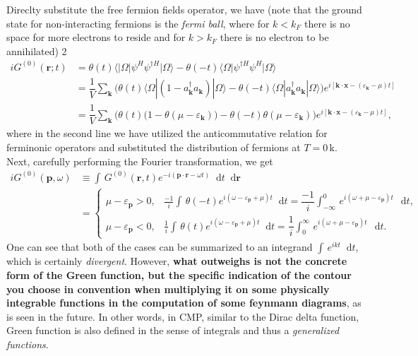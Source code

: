 \documentclass[b5paper,10pt,UTF8]{book}
\newcommand*\dd{\mathop{}\!\mathrm{d}}
\numberwithin{equation}{section}
\begin{document}
			\begin{Proof}
			Direclty substitute the free fermion fields operator, we have (note that the ground state for non-interacting fermions is the \emph{fermi ball}, where for $k<k_F$ there is no space for more electrons to reside and for $k>k_F$ there is no electron to be annihilated)
2				\begin{align*}
					iG^{(0)}(\bm{r};t)&=\theta(t)\langle|\Omega|\psi^H\psi^{\dagger H}|\Omega\rangle-\theta(-t)\langle\Omega|\psi^{\dagger H}\psi^H|\Omega\rangle\\\
					&=\dfrac{1}{V}\sum_{\bm{k}}\bigg(\theta(t)\langle\Omega|(1-a_{\bm{k}}^\dagger a_{\bm{k}})|\Omega\rangle-\theta(-t)\langle\Omega|a_{\bm{k}}^\dagger a_{\bm{k}}|\Omega\rangle\bigg)e^{i[\bm{k\cdot x}-(\varepsilon_{\bm{k}}-\mu)t]}\\
					&=\dfrac{1}{V}\sum_{\bm{k}}\bigg(\theta(t)\big(1-\theta(\mu-\varepsilon_{\bm{k}})\big)-\theta(-t)\theta(\mu-\varepsilon_{\bm{k}})\bigg)e^{i[\bm{k\cdot x}-(\varepsilon_{\bm{k}}-\mu)t]},
				\end{align*}
				where in the second line we have utilized the anticommutative relation for ferminonic operators and substituted the distribution of fermions at $T=0\,\mathrm{k}$. Next, carefully performing the Fourier transformation, we get 
				\begin{align*}
					iG^{(0)}(\bm{p},\omega)&\equiv\int\,G^{(0)}(\bm{r},t)e^{-i(\bm{p\cdot r}-\omega t)}\dd t\dd\bm{r}\\
					&=	\begin{cases}
							\displaystyle\mu-\varepsilon_{\bm{p}}>0,&\displaystyle\frac{-1}{i}\int\,\theta(-t)e^{i(\omega-\varepsilon_{\bm p}+\mu)t}\dd t=\dfrac{-1}{i}\int_{-\infty}^0\,e^{i(\omega+\mu-\varepsilon_{\bm p})t}\,\dd t,\\[0.7pc]
							\displaystyle\mu-\varepsilon_{\bm{p}}<0,&\displaystyle\frac{1}{i}\int\,\theta(t)e^{i(\omega-\varepsilon_{\bm p}+\mu)t}\dd t=\dfrac{1}{i}\int_0^\infty\,e^{i(\omega+\mu-\varepsilon_{\bm p})t}\,\dd t.
						\end{cases}
				\end{align*}
				One can see that both of the cases can be summarized to an integrand $\int\,e^{ikt}\dd t$, which is certainly \emph{divergent}. However, \textbf{what outweighs is not the concrete form of the Green function, but the specific indication of the contour you choose in convention when multiplying it on some physically integrable functions in the computation of some feynmann diagrams}, as is seen in the future. In other words, in CMP, similar to the Dirac delta function, Green function is also defined in the sense of integrals and thus a \emph{generalized functions}.\par

\end{Proof}
\end{document}
